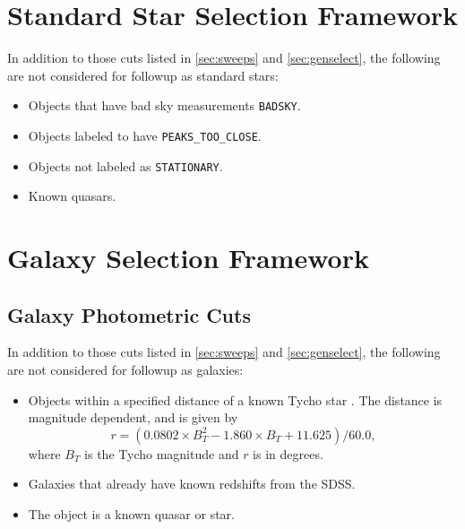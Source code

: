 \documentclass[12pt,preprint]{aastex}
\begin{document}
\section{Standard Star Selection Framework} \label{sec:std}

In addition to those cuts listed in \ref{sec:sweeps} and \ref{sec:genselect},
the following are not considered for followup as standard stars:

\begin{itemize}

    \item Objects that have bad sky measurements \texttt{BADSKY}.
    \item Objects labeled to have \texttt{PEAKS\_TOO\_CLOSE}.
    \item Objects not labeled as \texttt{STATIONARY}.
    \item Known quasars.
   
\end{itemize}



\section{Galaxy Selection Framework} \label{sec:galframe}

\subsection{Galaxy Photometric Cuts}

In addition to those cuts listed in \ref{sec:sweeps} and \ref{sec:genselect},
the following are not considered for followup as galaxies:

\begin{itemize}



    \item Objects within a specified distance of a known Tycho star
    \citep{tycho2}.  The distance is magnitude dependent, and is given 
    by
    \begin{equation}
    r = (0.0802\times B_T^2 - 1.860\times B_T + 11.625)/60.0,
    \end{equation}
    where $B_T$ is the Tycho magnitude and $r$ is in degrees.

    \item Galaxies that already have known redshifts from the SDSS.

    \item The object is a known quasar or star.

\end{itemize}
\end{document}
